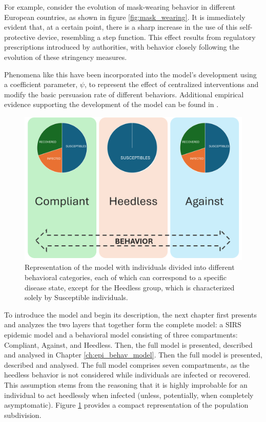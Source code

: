 For example, consider the evolution of mask-wearing behavior in different European countries, as shown in figure \ref{fig:mask_wearing}. It is immediately evident that, at a certain point, there is a sharp increase in the use of this self-protective device, resembling a step function. This effect results from regulatory prescriptions introduced by authorities, with behavior closely following the evolution of these stringency measures.

Phenomena like this have been incorporated into the model's development using a coefficient parameter, $\psi$, to represent the effect of centralized interventions and modify the basic persuasion rate of different behaviors. Additional empirical evidence supporting the development of the model can be found in \cite{Proverbio_Tex_2024}. 

\begin{figure}[ht]
	\centering
	\includegraphics[width=0.6\linewidth]{1_corpo/figure/Model_behav_epidemic}
	\caption[Epi-behavior model]{Representation of the model with individuals divided into different behavioral categories, each of which can correspond to a specific disease state, except for the Heedless group, which is characterized solely by Susceptible individuals.}
	\label{fig:modelbehavepidemic}
\end{figure}

To introduce the model and begin its description, the next chapter first presents and analyzes the two layers that together form the complete model: a SIRS epidemic model and a behavioral model consisting of three compartments: Compliant, Against, and Heedless. Then, the full model is presented, described and analysed in Chapter \ref{ch:epi_behav_model}.
Then the full model is presented, described and analysed. 
The full model comprises seven compartments, as the heedless behavior is not considered while individuals are infected or recovered. This assumption stems from the reasoning that it is highly improbable for an individual to act heedlessly when infected (unless, potentially, when completely asymptomatic). Figure \ref{fig:modelbehavepidemic} provides a compact representation of the population subdivision.

